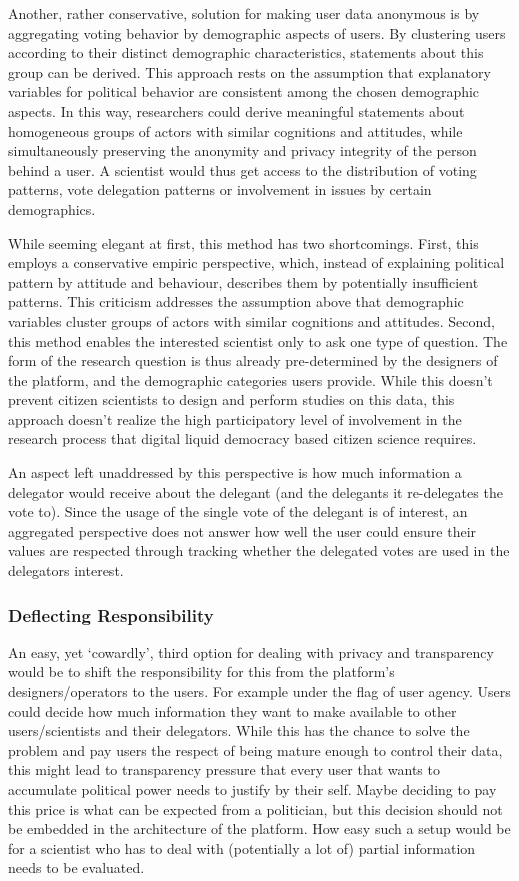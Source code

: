 Another, rather conservative, solution for making user data anonymous is by aggregating voting behavior by demographic aspects of users. By clustering users according to their distinct demographic characteristics, statements about this group can be derived. This approach rests on the assumption that explanatory variables for political behavior are consistent among the chosen demographic aspects. In this way, researchers could derive meaningful statements about homogeneous groups of actors with similar cognitions and attitudes, while simultaneously preserving the anonymity and privacy integrity of the person behind a user.
A scientist would thus get access to the distribution of voting patterns, vote delegation patterns or involvement in issues by certain demographics. 

While seeming elegant at first, this method has two shortcomings. First, this employs a conservative empiric perspective, which, instead of explaining political pattern by attitude and behaviour, describes them by potentially insufficient patterns. This criticism addresses the assumption above that demographic variables cluster groups of actors with similar cognitions and attitudes. Second, this method enables the interested scientist only to ask one type of question. The form of the research question is thus already pre-determined by the designers of the platform, and the demographic categories users provide. While this doesn't prevent citizen scientists to design and perform studies on this data, this approach doesn't realize the high participatory level of involvement in the research process that digital liquid democracy based citizen science requires.

An aspect left unaddressed by this perspective is how much information a delegator would receive about the delegant (and the delegants it re-delegates the vote to). Since the usage of the single vote of the delegant is of interest, an aggregated perspective does not answer how well the user could ensure their values are respected through tracking whether the delegated votes are used in the delegators interest. 

\subsubsection{Deflecting Responsibility}

An easy, yet ‘cowardly’, third option for dealing with privacy and transparency would be to shift the responsibility for this from the platform's designers/operators to the users. For example under the flag of user agency. Users could decide how much information they want to make available to other users/scientists and their delegators. While this has the chance to solve the problem and pay users the respect of being mature enough to control their data, this might lead to transparency pressure that every user that wants to accumulate political power needs to justify by their self. Maybe deciding to pay this price is what can be expected from a politician, but this decision should not be embedded in the architecture of the platform. How easy such a setup would be for a scientist who has to deal with (potentially a lot of) partial information needs to be evaluated.

